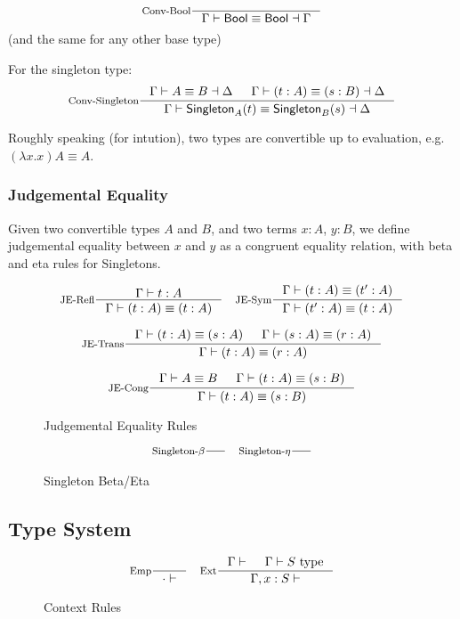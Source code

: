 \[
\inference[Conv-Bool]{}{\Gamma \vdash \Bool \equiv \Bool \dashv \Gamma}
\]
(and the same for any other base type)

For the singleton type:
\[
\inference[Conv-Singleton]
    { \Gamma \vdash A \equiv B \dashv \Delta
    & \Gamma \vdash (t : A) \equiv (s : B) \dashv \Delta
    }
    { \Gamma \vdash \Singleton{A}{t} \equiv \Singleton{B}{s} \dashv \Delta }
\]

Roughly speaking (for intution), two types are convertible up to evaluation, e.g. $(\lambda x. x) A \equiv A$.

\subsubsection{Judgemental Equality}
Given two convertible types $A$ and $B$, and two terms $x : A$, $y : B$, we define judgemental equality between $x$ and $y$ as a congruent equality relation, with beta and eta rules for Singletons.

\begin{figure*}[h]
  \[
    \inference[JE-Refl]{\Gamma \vdash t : A}
                    {\Gamma \vdash (t : A) \equiv (t : A)}
    \quad
    \inference[JE-Sym]{\Gamma \vdash (t : A) \equiv (t' : A)}
                     {\Gamma \vdash (t' : A) \equiv (t : A)}
  \]

  \[
    \inference[JE-Trans]{\Gamma \vdash (t : A) \equiv (s : A) & \Gamma \vdash (s : A) \equiv (r : A)}
                     {\Gamma \vdash (t : A) \equiv (r : A)}
  \]

  \[
    \inference[JE-Cong]{\Gamma \vdash A \equiv B & \Gamma \vdash (t : A) \equiv (s : B)}
                     {\Gamma \vdash (t : A) \equiv (s : B)}
  \]

  \caption*{Judgemental Equality Rules}
  \label{fig:base-dt-je-rules}
\end{figure*}


\begin{figure*}[h]
  \[
    \inference[Singleton-$\beta$]{}
                    {}
    \quad
    \inference[Singleton-$\eta$]{}
                     {}
  \]

  \caption*{Singleton Beta/Eta}
  \label{fig:base-dt-singleton-beta-eta}
\end{figure*}


\subsection{Type System}
\begin{figure*}[h]
  \[
    \inference[Emp]{}
                    {\cdot \vdash}
    \quad
    \inference[Ext]{\Gamma \vdash & \Gamma \vdash \type{S}}
                     {\Gamma, x : S \vdash}
  \]

  \caption*{Context Rules}
  \label{fig:base-dt-context}
\end{figure*}

